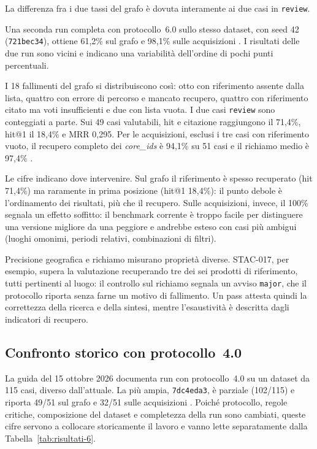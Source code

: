 La differenza fra i due tassi del grafo è dovuta interamente ai due casi in
\texttt{review}.

Una seconda run completa con protocollo~6.0 sullo stesso dataset, con seed 42
(\texttt{721bec34}), ottiene 61,2\% sul grafo e 98,1\% sulle acquisizioni
\cite{riscontroTecnico2026}. I risultati delle due run sono vicini e indicano
una variabilità dell'ordine di pochi punti percentuali.

I 18 fallimenti del grafo si distribuiscono così: otto con riferimento assente
dalla lista, quattro con errore di percorso e mancato recupero, quattro con
riferimento citato ma voti insufficienti e due con lista vuota. I due casi
\texttt{review} sono conteggiati a parte.
Sui 49 casi valutabili, hit e citazione raggiungono il 71,4\%, hit@1 il
18,4\% e MRR 0,295. Per le acquisizioni, esclusi i tre casi con riferimento
vuoto, il recupero completo dei \emph{core\_ids} è 94,1\% su 51 casi e il
richiamo medio è 97,4\% \cite{riscontroTecnico2026}.

Le cifre indicano dove intervenire. Sul grafo il riferimento è spesso
recuperato (hit 71,4\%) ma raramente in prima posizione (hit@1 18,4\%): il
punto debole è l'ordinamento dei risultati, più che il recupero. Sulle
acquisizioni, invece, il 100\% segnala un effetto soffitto: il benchmark
corrente è troppo facile per distinguere una versione migliore da una peggiore
e andrebbe esteso con casi più ambigui (luoghi omonimi, periodi relativi,
combinazioni di filtri).

Precisione geografica e richiamo misurano proprietà diverse. STAC-017, per
esempio, supera la valutazione recuperando tre dei sei prodotti di
riferimento, tutti pertinenti al luogo: il controllo sul richiamo segnala un
avviso \texttt{major}, che il protocollo riporta senza farne un motivo di
fallimento. Un pass attesta quindi la correttezza della ricerca e della
sintesi, mentre l'esaustività è descritta dagli indicatori di recupero.

\subsection{Confronto storico con protocollo~4.0}

La guida del 15 ottobre 2026 documenta run con protocollo~4.0 su un dataset da
115 casi, diverso dall'attuale. La più ampia, \texttt{7dc4eda3}, è parziale
(102/115) e riporta 49/51 sul grafo e 32/51 sulle acquisizioni
\cite{guidaProgetto2026}. Poiché protocollo, regole critiche, composizione del
dataset e completezza della run sono cambiati, queste cifre servono a
collocare storicamente il lavoro e vanno lette separatamente dalla
Tabella~\ref{tab:risultati-6}.

